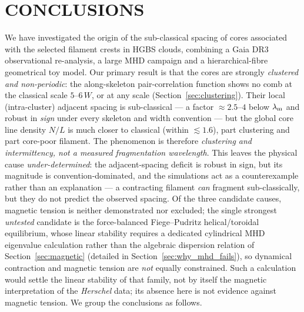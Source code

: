 \documentclass[usenatbib,twoside,twocolumn]{mnras}
\begin{document}
\section{CONCLUSIONS}

We have investigated the origin of the sub-classical spacing of cores associated with the selected filament crests in HGBS clouds, combining a Gaia DR3 observational re-analysis, a large MHD campaign and a hierarchical-fibre geometrical toy model. Our primary result is that the cores are strongly \emph{clustered and non-periodic}: the along-skeleton pair-correlation function shows no comb at the classical scale $5$--$6\,W$, or at any scale (Section~\ref{sec:clustering}). Their local (intra-cluster) adjacent spacing is sub-classical --- a factor $\approx2.5$--$4$ below $\lambda_{\rm m}$ and robust in \emph{sign} under every skeleton and width convention --- but the global core line density $N/L$ is much closer to classical (within $\lesssim1.6$), part clustering and part core-poor filament. The phenomenon is therefore \emph{clustering and intermittency, not a measured fragmentation wavelength}. This leaves the physical cause \emph{under-determined}: the adjacent-spacing deficit is robust in sign, but its magnitude is convention-dominated, and the simulations act as a counterexample rather than an explanation --- a contracting filament \emph{can} fragment sub-classically, but they do not predict the observed spacing. Of the three candidate causes, magnetic tension is neither demonstrated nor excluded; the single strongest \emph{untested} candidate is the force-balanced Fiege--Pudritz helical/toroidal equilibrium, whose linear stability requires a dedicated cylindrical MHD eigenvalue calculation rather than the algebraic dispersion relation of Section~\ref{sec:magnetic} (detailed in Section~\ref{sec:why_mhd_fails}), so dynamical contraction and magnetic tension are \emph{not} equally constrained. Such a calculation would settle the linear stability of that family, not by itself the magnetic interpretation of the \textit{Herschel} data; its absence here is not evidence against magnetic tension. We group the conclusions as follows.
\end{document}
